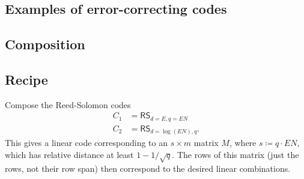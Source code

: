 \documentclass[11pt]{scrreprt}
\begin{document}
\subsection{Examples of error-correcting codes}

\subsection{Composition}

\subsection{Recipe}
Compose the Reed-Solomon codes
\begin{align*}
  C_1 &= \mathsf{RS}_{d=E,q=EN} \\
  C_2 &= \mathsf{RS}_{d=\log(EN),q}.
\end{align*}
This gives a linear code corresponding to an $s \times m$ matrix $M$,
where $s \coloneqq q \cdot EN$, which has relative distance at least $1 - 1/\sqrt q$.
The rows of this matrix (just the rows, not their row span)
then correspond to the desired linear combinations.
\end{document}
